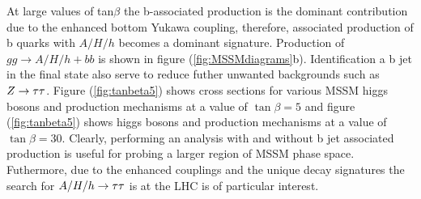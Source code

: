 At large values of tan$\beta$ 
the b-associated production is the dominant contribution due to the enhanced bottom Yukawa 
coupling, therefore, associated production of b quarks with $A/H/h$ becomes a dominant signature.
Production of $gg\rightarrow A/H/h+bb$ is shown in figure (\ref{fig:MSSMdiagrams}b). 
Identification a b jet in the final state also serve to reduce futher unwanted backgrounds
such as $Z\rightarrow \mathrm{\tau}\mathrm{\tau}$. 
Figure (\ref{fig:tanbeta5}) shows cross sections for various MSSM higgs bosons 
and production mechanisms at a value of $\tan\beta=5$ and figure (\ref{fig:tanbeta5})
shows higgs bosons and production mechanisms at a value of $\tan\beta=30$.
Clearly, performing an analysis with and without b jet associated
production is useful for probing a larger region of MSSM phase space. Futhermore, due to the
enhanced couplings and the unique decay signatures the search for $A/H/h\rightarrow \mathrm{\tau}\mathrm{\tau}$
is at the LHC is of particular interest.

